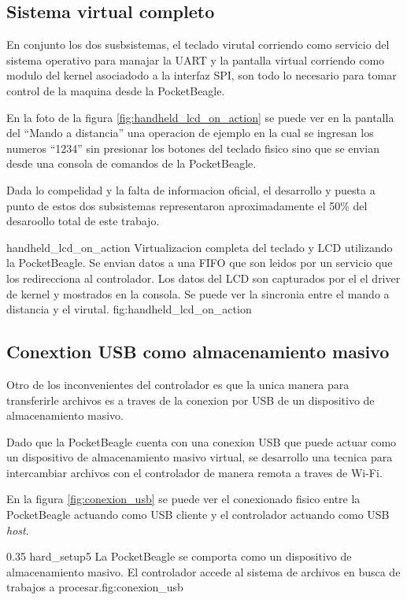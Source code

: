 \subsection{Sistema virtual completo}
      En conjunto los dos susbsistemas, el teclado virutal corriendo como servicio del sistema operativo para manajar la UART y la pantalla virtual corriendo como modulo del kernel asociadodo a la interfaz SPI, son todo lo necesario para tomar control de la maquina desde la PocketBeagle.\par
      En la foto de la figura \ref{fig:handheld_lcd_on_action} se puede ver en la pantalla del ``Mando a distancia'' una operacion de ejemplo en la cual se ingresan los numeros ``1234'' sin presionar los botones del teclado fisico sino que se envian desde una consola de comandos de la PocketBeagle.\par
      Dada lo compelidad y la falta de informacion oficial, el desarrollo y puesta a punto de estos dos subsistemas representaron aproximadamente el 50\% del desaroollo total de este trabajo.\par

         {handheld_lcd_on_action}
         {Virtualizacion completa del teclado y LCD utilizando la PocketBeagle. Se envian datos a una FIFO que son leidos por un servicio que los redirecciona al controlador. Los datos del LCD son capturados por el el driver de kernel y mostrados en la consola. Se puede ver la sincronia entre el mando a distancia y el virutal.}
         {fig:handheld_lcd_on_action}


\subsection{Conextion USB como almacenamiento masivo}
   Otro de los inconvenientes del controlador es que la unica manera para transferirle archivos es a traves de la conexion por USB de un dispositivo de almacenamiento masivo.\par
   Dado que la PocketBeagle cuenta con una conexion USB que puede actuar como un dispositivo de almacenamiento masivo virtual, se desarrollo una tecnica para intercambiar archivos con el controlador de manera remota a traves de Wi-Fi. \par
   En la figura \ref{fig:conexion_usb} se puede ver el conexionado fisico entre la PocketBeagle actuando como USB cliente y el controlador actuando como USB \textit{host}.

\subfiga 
   {0.35} {hard_setup5} {La PocketBeagle se comporta como un dispositivo de almacenamiento masivo. El controlador accede al sistema de archivos en busca de trabajos a procesar.}{fig:conexion_usb}

